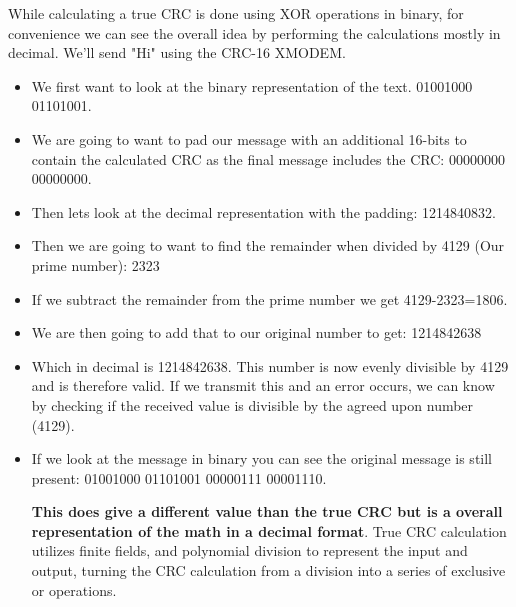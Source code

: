 While calculating a true CRC is done using XOR operations in binary, for convenience we can see the overall idea by performing the calculations mostly in decimal. We'll send "Hi" using the CRC-16 XMODEM.
\begin{itemize}
    \item We first want to look at the binary representation of the text. 01001000 01101001. 
    \item We are going to want to pad our message with an additional 16-bits to contain the calculated CRC as the final message includes the CRC: 00000000 00000000.
    \item Then lets look at the decimal representation with the padding: 1214840832.
    \item Then we are going to want to find the remainder when divided by 4129 (Our prime number): 2323
    \item If we subtract the remainder from the prime number we get 4129-2323=1806.
    \item We are then going to add that to our original number to get: 1214842638
    \item Which in decimal is 1214842638. This number is now evenly divisible by 4129 and is therefore valid. If we transmit this and an error occurs, we can know by checking if the received value is divisible by the agreed upon number (4129).
    \item If we look at the message in binary you can see the original message is still present: 01001000 01101001 00000111 00001110.

\textbf{This does give a different value than the true CRC but is a overall representation of the math in a decimal format}. True CRC calculation utilizes finite fields, and polynomial division to represent the input and output, turning the CRC calculation from a division into a series of exclusive or operations. 
\end{itemize}
